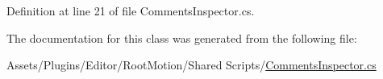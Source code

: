 Definition at line 21 of file Comments\+Inspector.\+cs.



The documentation for this class was generated from the following file\+:\begin{DoxyCompactItemize}
\item 
Assets/\+Plugins/\+Editor/\+Root\+Motion/\+Shared Scripts/\mbox{\hyperlink{_comments_inspector_8cs}{Comments\+Inspector.\+cs}}\end{DoxyCompactItemize}
